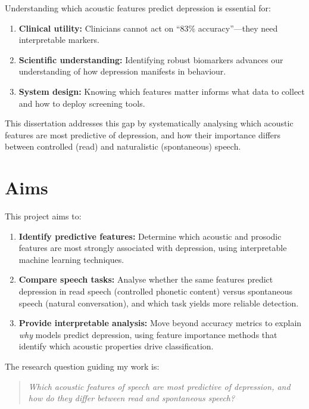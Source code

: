 Understanding which acoustic features predict depression is essential for:
\begin{enumerate}
    \item \textbf{Clinical utility:} Clinicians cannot act on ``83\% accuracy''—they need interpretable markers.
    \item \textbf{Scientific understanding:} Identifying robust biomarkers advances our understanding of how depression manifests in behaviour.
    \item \textbf{System design:} Knowing which features matter informs what data to collect and how to deploy screening tools.
\end{enumerate}

This dissertation addresses this gap by systematically analysing which acoustic features are most predictive of depression, and how their importance differs between controlled (read) and naturalistic (spontaneous) speech.


\section{Aims}

This project aims to:

\begin{enumerate}
    \item \textbf{Identify predictive features:} Determine which acoustic and prosodic features are most strongly associated with depression, using interpretable machine learning techniques.
    
    \item \textbf{Compare speech tasks:} Analyse whether the same features predict depression in read speech (controlled phonetic content) versus spontaneous speech (natural conversation), and which task yields more reliable detection.
    
    \item \textbf{Provide interpretable analysis:} Move beyond accuracy metrics to explain \textit{why} models predict depression, using feature importance methods that identify which acoustic properties drive classification.
\end{enumerate}

The research question guiding my work is:

\begin{quote}
\textit{Which acoustic features of speech are most predictive of depression, and how do they differ between read and spontaneous speech?}
\end{quote}



